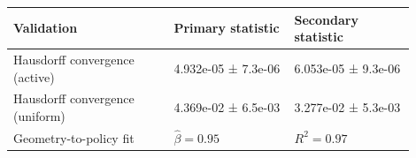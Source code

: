 \begin{tabular}{p{0.36\linewidth}p{0.27\linewidth}p{0.27\linewidth}}
\toprule
Validation & Primary statistic & Secondary statistic \\
\midrule
Hausdorff convergence (active) & 4.932e-05 ± 7.3e-06 & 6.053e-05 ± 9.3e-06 \\
Hausdorff convergence (uniform) & 4.369e-02 ± 6.5e-03 & 3.277e-02 ± 5.3e-03 \\
Geometry-to-policy fit & $\widehat{\beta}=0.95$ & $R^2=0.97$ \\
\bottomrule
\end{tabular}
